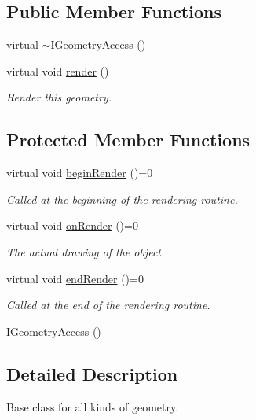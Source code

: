 \subsection*{Public Member Functions}
\begin{DoxyCompactItemize}
\item 
virtual \mbox{\hyperlink{classec_1_1_i_geometry_access_a786b4a8489f1c7fd6c4c2685fc53e7dc}{$\sim$\+I\+Geometry\+Access}} ()
\item 
virtual void \mbox{\hyperlink{classec_1_1_i_geometry_access_a9b6eaf56646bc2b5aa29385aaba02c7d}{render}} ()
\begin{DoxyCompactList}\small\item\em Render this geometry. \end{DoxyCompactList}\end{DoxyCompactItemize}
\subsection*{Protected Member Functions}
\begin{DoxyCompactItemize}
\item 
virtual void \mbox{\hyperlink{classec_1_1_i_geometry_access_a17a87aca44e2a23a6185e78262e02652}{begin\+Render}} ()=0
\begin{DoxyCompactList}\small\item\em Called at the beginning of the rendering routine. \end{DoxyCompactList}\item 
virtual void \mbox{\hyperlink{classec_1_1_i_geometry_access_a2ee418c9fa4eb266347bae2f0ef8095b}{on\+Render}} ()=0
\begin{DoxyCompactList}\small\item\em The actual drawing of the object. \end{DoxyCompactList}\item 
virtual void \mbox{\hyperlink{classec_1_1_i_geometry_access_a6d3b9c34a8b73aeac26663ef349ce41f}{end\+Render}} ()=0
\begin{DoxyCompactList}\small\item\em Called at the end of the rendering routine. \end{DoxyCompactList}\item 
\mbox{\hyperlink{classec_1_1_i_geometry_access_aaf9faa0f583e89aa0b27db7cecbb7c6e}{I\+Geometry\+Access}} ()
\end{DoxyCompactItemize}


\subsection{Detailed Description}
Base class for all kinds of geometry. 

